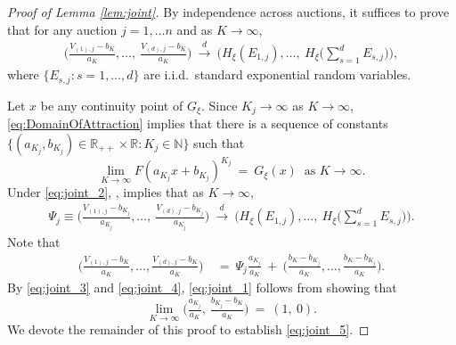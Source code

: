 \begin{proof}[Proof of Lemma \ref{lem:joint}]
By independence across auctions, it suffices to prove that for any auction $j=1,\ldots n$ and as $K\to\infty$,
\begin{align}
 \big( \tfrac{V_{(1),j}-b_{K}}{a_{K}},\dots ,~\tfrac{V_{(d),j}-b_{K}}{a_{K}}\big) ~\overset{d}{\to }~  \big( H_{\xi }(E_{1,j}),\dots ,~H_{\xi }\big( \sum\nolimits_{s=1}^{d}E_{s,j}\big) \big),\label{eq:joint_1}
\end{align}
where $\{E_{s,j}:s=1,\dots ,d\}$ are i.i.d.\ standard exponential random variables. 

Let $x$ be any continuity point of $G_{\xi }$. Since $K_{j}\to \infty $ as $K\to \infty $, \eqref{eq:DomainOfAttraction} implies that there is a sequence of constants $\{(a_{K_{j}},b_{K_{j}})\in \mathbb{R} _{++}\times \mathbb{R}:K_{j}\in \mathbb{N}\}$ such that
\begin{equation}
\lim_{K \to \infty} F( a_{K_{j}}x+b_{K_{j}}) ^{K_{j}}~=~ G_{\xi }( x)~\text{ as }K\to \infty. \label{eq:joint_2}
\end{equation}
Under \eqref{eq:joint_2}, \citet[Theorem 2.1.1]{dehaan2006book}, %
implies that as $K\to\infty$,
\begin{align}
\Psi_{j} \equiv\big( \tfrac{V_{(1),j}-b_{K_{j}}}{a_{K_{j}}},\dots ,~\tfrac{V_{(d),j}-b_{K_{j}}}{a_{K_{j}}}\big) ~\overset{d }{\to }~ \big( H_{\xi }(E_{1,j}),\dots ,~H_{\xi }\big( \sum\nolimits_{s=1}^{d}E_{s,j}\big) \big). \label{eq:joint_3} 
\end{align}
Note that
\begin{align}
\big( \tfrac{V_{(1),j}-b_{K}}{a_{K}},\dots ,\tfrac{V_{(d),j}-b_{K}}{a_{K}}\big)
&~=~ 
\Psi_{j} \tfrac{ a_{K_{j}}}{a_{K}} ~+~\big( \tfrac{b_{K}-b_{K_{j}}}{a_{K}},\dots ,\tfrac{b_{K}-b_{K_{j}}}{a_{K}}\big). \label{eq:joint_4}
\end{align}
By \eqref{eq:joint_3} and \eqref{eq:joint_4}, \eqref{eq:joint_1} follows from showing that
\begin{equation}
\lim_{K \to \infty} \big( \tfrac{a_{K_{j}}}{a_{K}},~\tfrac{b_{K_{j}}-b_{K}}{a_{K}}\big) ~=~ ( 1,~0) . \label{eq:joint_5}
\end{equation}
We devote the remainder of this proof to establish \eqref{eq:joint_5}.


\end{proof}
